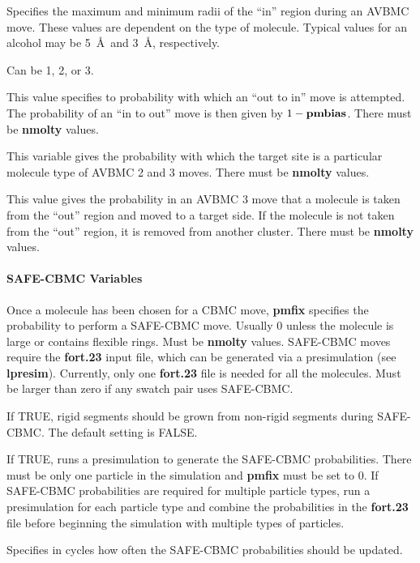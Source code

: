 \documentclass[12pt,letterpaper]{article}
\begin{document}
 Specifies the maximum and
minimum radii of the ``in'' region during an AVBMC move.
These values are dependent on the type of molecule. Typical
values for an alcohol may be 5~\AA~and 3~\AA, respectively.

 Can be 1, 2, or 3.

 This value specifies to probability
with which an ``out to in'' move is attempted. The
probability of an ``in to out'' move is then given by $1 -
{\bf pmbias}$. There must be {\bf nmolty} values.

 This variable gives the probability
with which the target site is a particular molecule type of
AVBMC 2 and 3 moves. There must be {\bf nmolty} values.

 This value gives the probability in
an AVBMC 3 move that a molecule is taken from the ``out''
region and moved to a target side. If the molecule is not
taken from the ``out'' region, it is removed from another
cluster. There must be {\bf nmolty} values.

\paragraph{SAFE-CBMC Variables}

 Once a molecule has been chosen for a
CBMC move, {\bf pmfix} specifies the probability to perform
a SAFE-CBMC move. Usually 0 unless the molecule is large or
contains flexible rings. Must be {\bf nmolty} values.
SAFE-CBMC moves require the {\bf fort.23} input file, which
can be generated via a presimulation (see {\bf lpresim}). 
Currently, only one {\bf fort.23} file is needed for 
all the molecules.
Must be larger than zero if any swatch pair uses SAFE-CBMC.

 If TRUE, rigid segments should be grown
from non-rigid segments during SAFE-CBMC. The default
setting is FALSE.

 If TRUE, runs a presimulation to
generate the SAFE-CBMC probabilities. There must be only one
particle in the simulation and {\bf pmfix} must be set to 0.
If SAFE-CBMC probabilities are required for multiple
particle types, run a presimulation for each particle type
and combine the probabilities in the {\bf fort.23} file
before beginning the simulation with multiple types of
particles.

 Specifies in cycles how often the
SAFE-CBMC probabilities should be updated.
\end{document}
